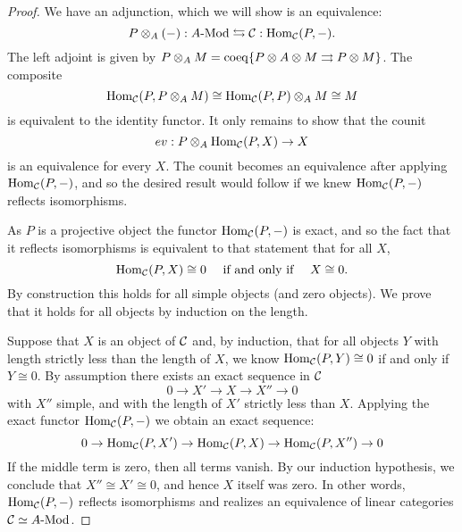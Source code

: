 \documentclass{amsart}
\begin{document}
\begin{proof}
We have an adjunction, which we will show is an equivalence:
	\begin{equation*}
		P \otimes_A (-):\Mod{A}{} \leftrightarrows \cC: \Hom_{\cC}(P,-).
	\end{equation*}
	The left adjoint is given by $P \otimes_A M = \operatorname{coeq}\{ P \otimes A \otimes M \rightrightarrows P \otimes M\}$. 
The composite 
\begin{equation*}
	\operatorname{Hom}_{\mathcal C}(P, P \otimes_A M) \cong \operatorname{Hom}_{\mathcal C}(P, P) \otimes_A M \cong M
\end{equation*}
 is equivalent to the identity functor. It only remains to show that the counit 
\begin{equation*}
	ev:P \otimes_A \operatorname{Hom}_{\mathcal C}(P, X) \to X
\end{equation*}
is an equivalence for every $X$. The counit becomes an equivalence after applying $\operatorname{Hom}_{\mathcal C}(P,-)$, and so the desired result would follow if we knew $\operatorname{Hom}_{\mathcal C}(P,-)$ reflects isomorphisms. 

As $P$ is a projective object the functor $\operatorname{Hom}_{\mathcal C}(P,-)$ is exact, and so the fact that it reflects isomorphisms is equivalent to that statement that for all $X$, 
\begin{equation*}
	\operatorname{Hom}_{\mathcal C}(P,X) \cong 0 \quad \textrm{ if and only if } \quad X \cong 0.
\end{equation*} 
By construction this holds for all simple objects (and zero objects). We prove that it holds for all objects by induction on the length. 

Suppose that $X$ is an object of $\mathcal C$ and, by induction, that for all objects $Y$ with length strictly less than the length of $X$, we know $\operatorname{Hom}_{\mathcal C}(P,Y) \cong 0$ if and only if $Y \cong 0$. By assumption there exists an exact sequence in $\mathcal C$
\begin{equation*}
	0 \to X' \to X \to X'' \to 0
\end{equation*}
with $X''$ simple, and with the length of $X'$ strictly less than $X$. Applying the exact functor $\operatorname{Hom}_{\mathcal C}(P,-)$ we obtain an exact sequence:
\begin{equation*}
	0 \to \operatorname{Hom}_{\mathcal C}(P,X') \to \operatorname{Hom}_{\mathcal C}(P,X) \to \operatorname{Hom}_{\mathcal C}(P,X'') \to 0
\end{equation*}
If the middle term is zero, then all terms vanish. By our induction hypothesis, we conclude that $X'' \cong X' \cong 0$, and hence $X$ itself was zero. In other words, $\operatorname{Hom}_{\mathcal C}(P,-)$ reflects isomorphisms and realizes an equivalence of linear categories $\cC \simeq \Mod{A}{}$.
\end{proof}
\end{document}
